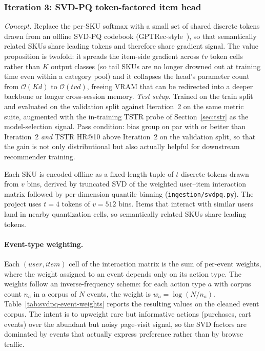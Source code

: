 \documentclass[sigconf,nonacm]{acmart}
\begin{document}
\subsubsection{Iteration 3: SVD-PQ token-factored item head}
\label{sec:iter3-svdpq}
\textit{Concept.} Replace the per-SKU softmax with a small set of
shared discrete tokens drawn from an offline SVD-PQ codebook
(GPTRec-style~\cite{petrov2023gptrec}), so that semantically related
SKUs share leading tokens and therefore share gradient signal. The
value proposition is twofold: it spreads the item-side gradient across
$tv$ token cells rather than $K$ output classes (so tail SKUs are no
longer drowned out at training time even within a category pool) and
it collapses the head's parameter count from $\mathcal{O}(Kd)$ to
$\mathcal{O}(tvd)$, freeing VRAM that can be redirected into a deeper
backbone or longer cross-session memory.
\textit{Test setup.} Trained on the train split and evaluated on the
validation split against Iteration~2 on the same metric suite,
augmented with the in-training TSTR probe of
Section~\ref{sec:tstr} as the model-selection signal. Pass condition:
bias group on par with or better than Iteration~2 \emph{and} TSTR
HR@10 above Iteration~2 on the validation split, so that the gain is
not only distributional but also actually helpful for downstream
recommender training.

Each SKU is encoded offline as a fixed-length tuple of $t$ discrete
tokens drawn from $v$ bins, derived by truncated SVD of the weighted
user--item interaction matrix followed by per-dimension quantile
binning (\texttt{ingestion/svdpq.py}). The project uses $t=4$ tokens
of $v=512$ bins. Items that interact with similar users land in nearby
quantization cells, so semantically related SKUs share leading tokens.

\paragraph{Event-type weighting.}
Each $(\textit{user}, \textit{item})$ cell of the interaction matrix
is the sum of per-event weights, where the weight assigned to an event
depends only on its action type. The weights follow an
inverse-frequency scheme: for each action type $a$ with corpus count
$n_a$ in a corpus of $N$ events, the weight is $w_a = \log(N / n_a)$.
Table~\ref{tab:svdpq-event-weights} reports the resulting values on the
cleaned event corpus. The intent is to upweight rare but informative
actions (purchases, cart events) over the abundant but noisy
page-visit signal, so the SVD factors are dominated by events that
actually express preference rather than by browse traffic.
\end{document}
